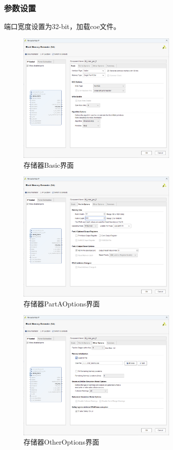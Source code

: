 \subsubsection{参数设置}
端口宽度设置为32-bit，加载coe文件。
\begin{figure}[H]
    \centering
    \includegraphics[width=0.7\textwidth]{image/pic1.png}
    \caption{存储器Basic界面}
	\label{fig:basic}
\end{figure}
\begin{figure}[H]
    \centering
    \includegraphics[width=0.7\textwidth]{image/pic2.png}
    \caption{存储器PartAOptions界面}
	\label{fig:partaoption}
\end{figure}
\begin{figure}[htbp]
    \centering
    \includegraphics[width=0.7\textwidth]{image/pic3.png}
    \caption{存储器OtherOptions界面}
	\label{fig:otheroption}
\end{figure}

